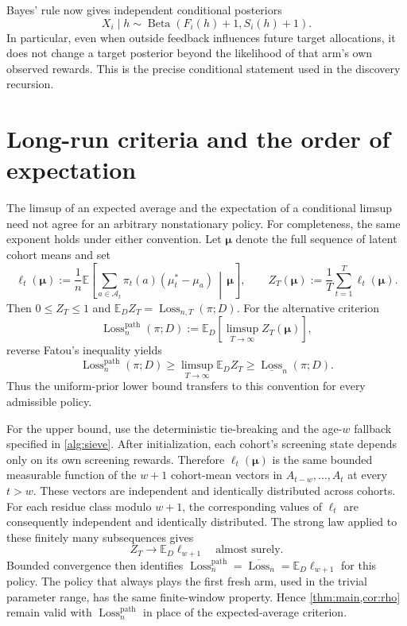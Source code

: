 \documentclass[11pt,letterpaper]{article}
\numberwithin{equation}{section}
\theoremstyle{definition}
\theoremstyle{remark}
\newcommand{\E}{\mathbb{E}}
\newcommand{\1}{\mathbf{1}}
\newcommand{\A}{\mathcal{A}}
\newcommand{\Loss}{\operatorname{Loss}}
\newcommand{\BetaDist}{\operatorname{Beta}}
\begin{document}
Bayes' rule now gives independent conditional posteriors
\[
  X_i\mid h\sim\BetaDist(F_i(h)+1,S_i(h)+1).
\]
In particular, even when outside feedback influences future target
allocations, it does not change a target posterior beyond the
likelihood of that arm's own observed rewards. This is the precise
conditional statement used in the discovery recursion.

\section{Long-run criteria and the order of expectation}\label{app:long-run}

The limsup of an expected average and the expectation of a conditional
limsup need not agree for an arbitrary nonstationary policy.
For completeness, the same exponent holds under either convention.
Let $\boldsymbol\mu$ denote the full sequence of latent cohort means and set
\[
  \ell_t(\boldsymbol\mu)
  :=\frac1n\E\!\left[
       \sum_{a\in\A_t}\pi_t(a)(\mu_t^*-\mu_a)
       \,\middle|\,\boldsymbol\mu\right],
  \qquad
  Z_T(\boldsymbol\mu):=\frac1T\sum_{t=1}^{T}\ell_t(\boldsymbol\mu).
\]
Then $0\le Z_T\le1$ and
$\E_D Z_T=\Loss_{n,T}(\pi;D)$.
For the alternative criterion
\[
  \Loss_n^{\mathrm{path}}(\pi;D)
  :=\E_D\!\left[\limsup_{T\to\infty}Z_T(\boldsymbol\mu)\right],
\]
reverse Fatou's inequality yields
\[
  \Loss_n^{\mathrm{path}}(\pi;D)
  \ge \limsup_{T\to\infty}\E_D Z_T
  \ge \underline{\Loss}_n(\pi;D).
\]
Thus the uniform-prior lower bound transfers to this convention for
every admissible policy.

For the upper bound, use the deterministic tie-breaking and the
age-$w$ fallback specified in \cref{alg:sieve}.
After initialization, each cohort's screening state depends only
on its own screening rewards. Therefore
$\ell_t(\boldsymbol\mu)$ is the same bounded measurable function of
the $w+1$ cohort-mean vectors in $A_{t-w},\ldots,A_t$ at every
$t>w$. These vectors are independent and identically distributed
across cohorts. For each residue class modulo $w+1$, the corresponding
values of $\ell_t$ are consequently independent and identically
distributed. The strong law applied to these finitely many
subsequences gives
\[
  Z_T\longrightarrow \E_D\ell_{w+1}
  \quad\text{almost surely}.
\]
Bounded convergence then identifies
$\Loss_n^{\mathrm{path}}=\overline{\Loss}_n=\E_D\ell_{w+1}$
for this policy. The policy that always plays the first fresh arm, used in the trivial
parameter range, has the same finite-window property. Hence
\cref{thm:main,cor:rho} remain valid with
$\Loss_n^{\mathrm{path}}$ in place of the expected-average criterion.
\end{document}
